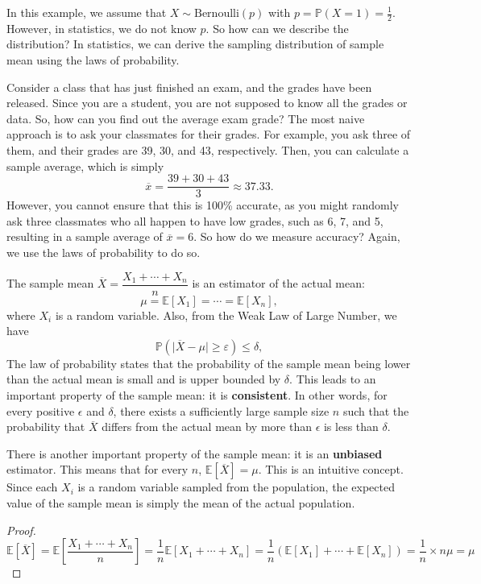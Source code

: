 In this example, we assume that \(X \sim \text{Bernoulli}(p)\) with \(p = \mathbb{P}(X = 1) = \frac{1}{2}\). However, in statistics, we do not know \(p\). So how can we describe the distribution? In statistics, we can derive the sampling distribution of sample mean using the laws of probability. 

Consider a class that has just finished an exam, and the grades have been released. Since you are a student, you are not supposed to know all the grades or data. So, how can you find out the average exam grade? The most naive approach is to ask your classmates for their grades. For example, you ask three of them, and their grades are 39, 30, and 43, respectively. Then, you can calculate a sample average, which is simply
\[
  \overline{x} = \dfrac{39 + 30 + 43}{3} \approx 37.33. 
\]
However, you cannot ensure that this is 100\% accurate, as you might randomly ask three classmates who all happen to have low grades, such as 6, 7, and 5, resulting in a sample average of \(\overline{x} = 6\). So how do we measure accuracy? Again, we use the laws of probability to do so.

The sample mean \(\overline{X} = \dfrac{X_1 + \cdots + X_n}{n}\) is an estimator of the actual mean: 
\[
  \mu = \mathbb{E}[X_1] = \cdots = \mathbb{E}[X_n],
\]
where \(X_i\) is a random variable. Also, from the Weak Law of Large Number, we have 
\[
  \mathbb{P}(\vert \overline{X} - \mu \vert  \geq \varepsilon ) \leq \delta, 
\]
The law of probability states that the probability of the sample mean being lower than the actual mean is small and is upper bounded by \(\delta\). This leads to an important property of the sample mean: it is \textbf{consistent}. In other words, for every positive \(\epsilon\) and \(\delta\), there exists a sufficiently large sample size \(n\) such that the probability that \(\overline{X}\) differs from the actual mean by more than \(\epsilon\) is less than \(\delta\).

There is another important property of the sample mean: it is an \textbf{unbiased} estimator. This means that for every \(n\), \(\mathbb{E}[\overline{X}] = \mu\). This is an intuitive concept. Since each \(X_i\) is a random variable sampled from the population, the expected value of the sample mean is simply the mean of the actual population.

\begin{proof}
  \[
    \mathbb{E}[\overline{X}] = \mathbb{E}\left[\dfrac{X_1 + \cdots + X_n}{n}\right] = \dfrac{1}{n} \mathbb{E}[X_1 + \cdots + X_n] = \dfrac{1}{n} (\mathbb{E}[X_1] + \cdots + \mathbb{E}[X_n]) = \dfrac{1}{n} \times n\mu = \mu
  \]
\end{proof}

